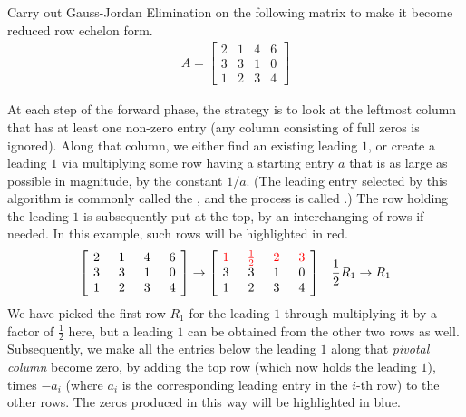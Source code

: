 \begin{exmp}
Carry out Gauss-Jordan Elimination on the following matrix to make it become reduced row echelon form.
\begin{align*}
A =
\begin{bmatrix}
2 & 1 & 4 & 6 \\
3 & 3 & 1 & 0 \\
1 & 2 & 3 & 4
\end{bmatrix}    
\end{align*}
\end{exmp}
\begin{solution}
At each step of the forward phase, the strategy is to look at the leftmost column that has at least one non-zero entry (any column consisting of full zeros is ignored). Along that column, we either find an existing leading $1$, or create a leading $1$ via multiplying some row having a starting entry $a$ that is as large as possible in magnitude, by the constant $1/a$. (The leading entry selected by this algorithm is commonly called the , and the process is called .) The row holding the leading $1$ is subsequently put at the top, by an interchanging of rows if needed. In this example, such rows will be highlighted in red.
\begin{align*}
\left[\begin{array}{@{\,}wc{10pt}wc{10pt}wc{10pt}wc{10pt}@{\,}}
2 & 1 & 4 & 6 \\
3 & 3 & 1 & 0 \\
1 & 2 & 3 & 4
\end{array}\right]
&\to
\left[\begin{array}{@{\,}wc{10pt}wc{10pt}wc{10pt}wc{10pt}@{\,}}
\mathcolor{red}{1} & \mathcolor{red}{\frac{1}{2}} & \mathcolor{red}{2} & \mathcolor{red}{3} \\
3 & 3 & 1 & 0 \\
1 & 2 & 3 & 4
\end{array}\right]
& \frac{1}{2}R_1 \to R_1
\end{align*}
We have picked the first row $R_1$ for the leading $1$ through multiplying it by a factor of $\frac{1}{2}$ here, but a leading $1$ can be obtained from the other two rows as well. Subsequently, we make all the entries below the leading $1$ along that \textit{pivotal column} become zero, by adding the top row (which now holds the leading $1$), times $-a_i$ (where $a_i$ is the corresponding leading entry in the $i$-th row) to the other rows. The zeros produced in this way will be highlighted in blue.

\end{solution}
